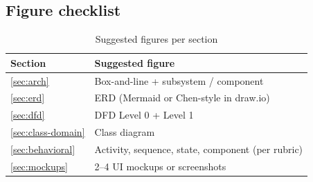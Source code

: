 \documentclass[12pt,a4paper]{report}
\begin{document}
\subsection{Figure checklist}

\begin{table}[htbp]
  \centering
  \small
  \caption{Suggested figures per section}
  \begin{tabular}{@{}ll@{}}
    \toprule
    \textbf{Section} & \textbf{Suggested figure} \\
    \midrule
    \ref{sec:arch} & Box-and-line + subsystem / component \\
    \ref{sec:erd} & ERD (Mermaid or Chen-style in draw.io) \\
    \ref{sec:dfd} & DFD Level 0 + Level 1 \\
    \ref{sec:class-domain} & Class diagram \\
    \ref{sec:behavioral} & Activity, sequence, state, component (per rubric) \\
    \ref{sec:mockups} & 2--4 UI mockups or screenshots \\
    \bottomrule
  \end{tabular}
\end{table}
\end{document}
